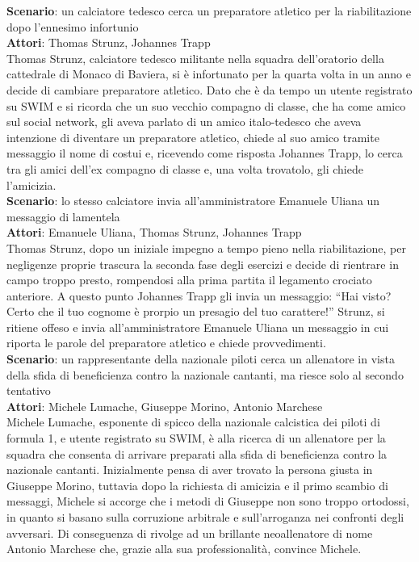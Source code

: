 \documentclass[a4paper,12pt]{article}
\begin{document}
\textbf{Scenario}: un calciatore tedesco cerca un preparatore atletico per la riabilitazione dopo l'ennesimo infortunio \\
\textbf{Attori}: Thomas Strunz, Johannes Trapp \\
Thomas Strunz, calciatore tedesco militante nella squadra dell'oratorio della cattedrale di Monaco di Baviera, si è infortunato per la quarta volta in un anno e decide di cambiare preparatore atletico. Dato che è da tempo un utente registrato su SWIM e si ricorda che un suo vecchio compagno di classe, che ha come amico sul social network, gli aveva parlato di un amico italo-tedesco che aveva intenzione di diventare un preparatore atletico, chiede al suo amico tramite messaggio il nome di costui e, ricevendo come risposta Johannes Trapp, lo cerca tra gli amici dell'ex compagno di classe e, una volta trovatolo, gli chiede l'amicizia. \\[1em]
\textbf{Scenario}: lo stesso calciatore invia all'amministratore Emanuele Uliana un messaggio di lamentela \\
\textbf{Attori}: Emanuele Uliana, Thomas Strunz, Johannes Trapp \\
Thomas Strunz, dopo un iniziale impegno a tempo pieno nella riabilitazione, per negligenze proprie trascura la seconda fase degli esercizi e decide di rientrare in campo troppo presto, rompendosi alla prima partita il legamento crociato anteriore. A questo punto Johannes Trapp gli invia un messaggio: “Hai visto? Certo che il tuo cognome è prorpio un presagio del tuo carattere!” Strunz, si ritiene offeso e invia all'amministratore Emanuele Uliana un messaggio in cui riporta le parole del preparatore atletico e chiede provvedimenti. \\[1em]
\textbf{Scenario}: un rappresentante della nazionale piloti cerca un allenatore in vista della sfida di beneficienza contro la nazionale cantanti, ma riesce solo al secondo tentativo \\
\textbf{Attori}: Michele Lumache, Giuseppe Morino, Antonio Marchese \\
Michele Lumache, esponente di spicco della nazionale calcistica dei piloti di formula 1, e utente registrato su SWIM, è alla ricerca di un allenatore per la squadra che consenta di arrivare preparati alla sfida di beneficienza contro la nazionale cantanti. Inizialmente pensa di aver trovato la persona giusta in Giuseppe Morino, tuttavia dopo la richiesta di amicizia e il primo scambio di messaggi, Michele si accorge che i metodi di Giuseppe non sono troppo ortodossi, in quanto si basano sulla corruzione arbitrale e sull'arroganza nei confronti degli avversari. Di conseguenza di rivolge ad un brillante neoallenatore di nome Antonio Marchese che, grazie alla sua professionalità, convince Michele. \\[1em]
\end{document}
